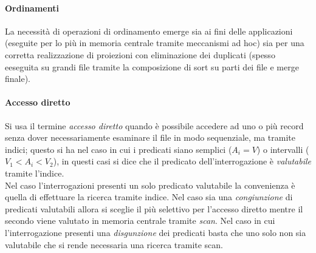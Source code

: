 \paragraph{Ordinamenti}
La necessità di operazioni di ordinamento emerge sia ai fini delle applicazioni (eseguite per lo più in memoria centrale tramite meccanismi ad hoc) sia per una corretta realizzazione di proiezioni con eliminazione dei duplicati (spesso eeseguita su grandi file tramite la composizione di sort su parti dei file e merge finale).
\paragraph{Accesso diretto}
 Si usa il termine \emph{accesso diretto} quando è possibile accedere ad uno o più record senza dover necessariamente esaminare il file in modo sequenziale, ma tramite indici; questo si ha nel caso in cui i predicati siano semplici ($A_i = V$) o intervalli ($V_1<A_i<V_2$), in questi casi si dice che il predicato dell'interrogazione è \emph{valutabile} tramite l'indice.\\
 Nel caso l'interrogazioni presenti un solo predicato valutabile la convenienza è quella di effettuare la ricerca tramite indice. Nel caso sia una \emph{congiunzione} di predicati valutabili allora si sceglie il più selettivo per l'accesso diretto mentre il secondo viene valutato in memoria centrale tramite \emph{scan}. Nel caso in cui l'interrogazione presenti una \emph{disgunzione} dei predicati basta che uno solo non sia valutabile che si rende necessaria una ricerca tramite scan.
